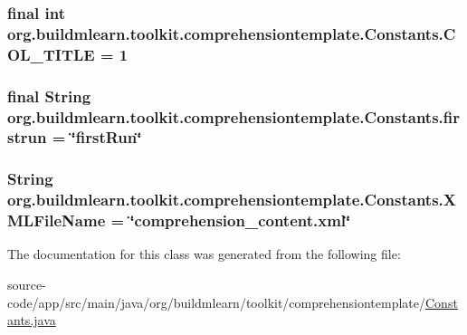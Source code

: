 \subsubsection[{\texorpdfstring{C\+O\+L\+\_\+\+T\+I\+T\+LE}{COL_TITLE}}]{\setlength{\rightskip}{0pt plus 5cm}final int org.\+buildmlearn.\+toolkit.\+comprehensiontemplate.\+Constants.\+C\+O\+L\+\_\+\+T\+I\+T\+LE = 1\hspace{0.3cm}{\ttfamily [static]}}\hypertarget{classorg_1_1buildmlearn_1_1toolkit_1_1comprehensiontemplate_1_1Constants_ab0c6c7fb3aa6b519cf104c730e977ce1}{}\label{classorg_1_1buildmlearn_1_1toolkit_1_1comprehensiontemplate_1_1Constants_ab0c6c7fb3aa6b519cf104c730e977ce1}
\subsubsection[{\texorpdfstring{firstrun}{firstrun}}]{\setlength{\rightskip}{0pt plus 5cm}final String org.\+buildmlearn.\+toolkit.\+comprehensiontemplate.\+Constants.\+firstrun = \char`\"{}first\+Run\char`\"{}\hspace{0.3cm}{\ttfamily [static]}}\hypertarget{classorg_1_1buildmlearn_1_1toolkit_1_1comprehensiontemplate_1_1Constants_a6fbb10848c407bcb8fc5e8eb86f74613}{}\label{classorg_1_1buildmlearn_1_1toolkit_1_1comprehensiontemplate_1_1Constants_a6fbb10848c407bcb8fc5e8eb86f74613}
\subsubsection[{\texorpdfstring{X\+M\+L\+File\+Name}{XMLFileName}}]{\setlength{\rightskip}{0pt plus 5cm}String org.\+buildmlearn.\+toolkit.\+comprehensiontemplate.\+Constants.\+X\+M\+L\+File\+Name = \char`\"{}comprehension\+\_\+content.\+xml\char`\"{}\hspace{0.3cm}{\ttfamily [static]}}\hypertarget{classorg_1_1buildmlearn_1_1toolkit_1_1comprehensiontemplate_1_1Constants_a17fc58f4be131d0dc62f53e01b3ca060}{}\label{classorg_1_1buildmlearn_1_1toolkit_1_1comprehensiontemplate_1_1Constants_a17fc58f4be131d0dc62f53e01b3ca060}


The documentation for this class was generated from the following file\+:\begin{DoxyCompactItemize}
\item 
source-\/code/app/src/main/java/org/buildmlearn/toolkit/comprehensiontemplate/\hyperlink{comprehensiontemplate_2Constants_8java}{Constants.\+java}\end{DoxyCompactItemize}
